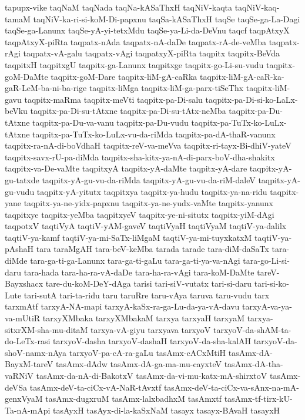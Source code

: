{tapupx-vike
taqNaM
taqNada
taqNa-kASaThxH
taqNiV-kaqta
taqNiV-kaq-tamaM
taqNiV-ka-ri-si-koM-Di-papxnu
taqSa-kASaThxH
taqSe
taqSe-ga-La-Dagi
taqSe-ga-Lanunx
taqSe-yA-yi-tetxMdu
taqSe-ya-Li-da-DeVnu
taqcf
taqpAtxyX
taqpAtxyX-piRta
taqpatx-nAda
taqpatx-nA-daDe
taqpatx-rA-de-veMba
taqpatx-rAgi
taqpatx-vA-galu
taqpatx-vAgi
taqpatxyX-piRta
taqpitx
taqpitx-BeVda
taqpitxH
taqpitxgU
taqpitx-ga-Lanunx
taqpitxge
taqpitx-go-Li-su-vudu
taqpitx-goM-DaMte
taqpitx-goM-Dare
taqpitx-liM-gA-caRka
taqpitx-liM-gA-caR-ka-gaR-LeM-ba-ni-ba-rige
taqpitx-liMga
taqpitx-liM-ga-parx-tiSeThx
taqpitx-liM-gavu
taqpitx-maRma
taqpitx-meVti
taqpitx-pa-Di-salu
taqpitx-pa-Di-si-ko-LaLx-beVku
taqpitx-pa-Di-su-tAtxne
taqpitx-pa-Di-su-tAtx-neMba
taqpitx-pa-Du-tAtxne
taqpitx-pa-Du-va-vanu
taqpitx-pa-Du-vudu
taqpitx-pa-TuTx-ko-LuLx-tAtxne
taqpitx-pa-TuTx-ko-LuLx-vu-da-riMda
taqpitx-pa-dA-thaR-vanunx
taqpitx-ra-nA-di-boVdhaH
taqpitx-reV-va-meVva
taqpitx-ri-tayx-Bi-dhiV-yateV
taqpitx-savx-rU-pa-diMda
taqpitx-sha-kitx-ya-nA-di-parx-boV-dha-shakitx
taqpitx-va-De-vaMte
taqpitxyA
taqpitx-yA-daMte
taqpitx-yA-dare
taqpitx-yA-gu-tatxde
taqpitx-yA-gu-vu-da-riMda
taqpitx-yA-gu-vu-da-riM-daleV
taqpitx-yA-gu-vudu
taqpitx-yA-yitutx
taqpitxya
taqpitx-ya-hudu
taqpitx-ya-na-ridu
taqpitx-yane
taqpitx-ya-ne-yidx-papxnu
taqpitx-ya-ne-yudx-vaMte
taqpitx-yanunx
taqpitxye
taqpitx-yeMba
taqpitxyeV
taqpitx-ye-ni-situtx
taqpitx-yiM-dAgi
taqpotxV
taqtiVyA
taqtiV-yAM-gaveV
taqtiVyaH
taqtiVyaM
taqtiV-ya-dalilx
taqtiV-ya-kamf
taqtiV-ya-mi-SaTx-liMgaM
taqtiV-ya-mi-tuyxkatxM
taqtiV-ya-pAshaH
tara
taraMgAH
tara-beV-keMba
tarada
tarade
tara-diM-daSaTx
tara-diMde
tara-ga-ti-ga-Lanunx
tara-ga-ti-gaLu
tara-ga-ti-ya-va-nAgi
tara-go-Li-si-daru
tara-hada
tara-ha-ra-vA-daDe
tara-ha-ra-vAgi
tara-koM-DaMte
tareV-Bayxshacx
tare-du-koM-DeY-dAga
tarisi
tari-siV-vutatx
tari-si-daru
tari-si-ko-Lute
tari-sutA
tari-ta-ridu
taru
taruRre
taru-vAya
taruva
taru-vudu
tarx
tarxmAtf
tarxyA-NA-mapi
tarxyA-kaSx-ra-ga-Lu-da-ya-vA-davu
tarxyA-va-ya-va-mUtiR
tarxyXMbaka
tarxyXMbakaM
tarxya
tarxyaH
tarxyaM
tarxya-sitxrXM-sha-mu-ditaM
tarxya-vA-giyu
tarxyava
tarxyoV
tarxyoV-da-shAM-ta-do-LeTx-rasi
tarxyoV-dasha
tarxyoV-dashaH
tarxyoV-da-sha-kalAH
tarxyoV-da-shoV-namx-nAya
tarxyoV-pa-cA-ra-gaLu
tasAmx-cACxMtiH
tasAmx-dA-BayxM-tareV
tasAmx-dAdw
tasAmx-dA-ga-ma-mu-cayxteV
tasAmx-dA-tha-vaRNiV
tasAmx-da-nA-di-BakotxV
tasAmx-da-vi-mu-katx-mA-shirxtoV
tasAmx-deVSa
tasAmx-deV-ta-ciCx-vA-NaR-tAvxtf
tasAmx-deV-ta-ciCx-va-sAnx-na-mA-genxVyaM
tasAmx-dugxruM
tasAmx-lalxbadhxM
tasAmxtf
tasAmx-tf-tirx-kU-Ta-nA-mApi
tasAyxH
tasAyx-di-la-kaSxNaM
tasayx
tasayx-BAvaH
tasayxH
}
